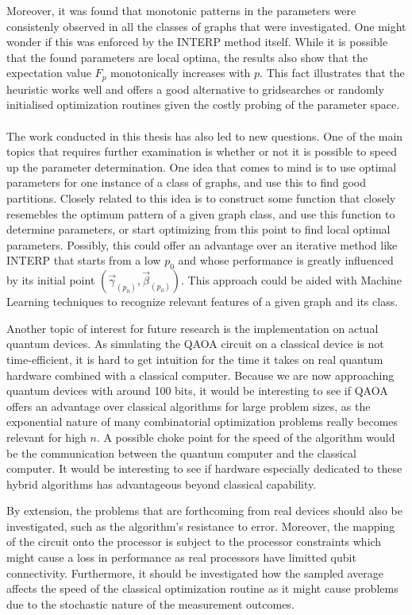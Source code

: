 Moreover, it was found that monotonic patterns in the parameters were consistenly observed in all the classes of graphs that were investigated. One might wonder if this was enforced by the INTERP method itself. While it is possible that the found parameters are local optima, the results also show that the expectation value $F_p$ monotonically increases with $p$. This fact illustrates that the heuristic works well and offers a good alternative to gridsearches or randomly initialised optimization routines given the costly probing of the parameter space.
\\~\\
The work conducted in this thesis has also led to new questions. One of the main topics that requires further examination is whether or not it is possible to speed up the parameter determination. One idea that comes to mind is to use optimal parameters for one instance of a class of graphs, and use this to find good partitions. Closely related to this idea is to construct some function that closely resemebles the optimum pattern of a given graph class, and use this function to determine parameters, or start optimizing from this point to find local optimal parameters. Possibly, this could offer an advantage over an iterative method like INTERP that starts from a low $p_0$ and whose performance is greatly influenced by its initial point $(\vec{\gamma}_{(p_0)}, \vec{\beta}_{(p_0)})$. This approach could be aided with Machine Learning techniques to recognize relevant features of a given graph and its class.

Another topic of interest for future research is the implementation on actual quantum devices. As simulating the QAOA circuit on a classical device is not time-efficient, it is hard to get intuition for the time it takes on real quantum hardware combined with a classical computer. Because we are now approaching quantum devices with around 100 bits, it would be interesting to see if QAOA offers an advantage over classical algorithms for large problem sizes, as the exponential nature of many combinatorial optimization problems really becomes relevant for high $n$. A possible choke point for the speed of the algorithm would be the communication between the quantum computer and the classical computer. It would be interesting to see if hardware especially dedicated to these hybrid algorithms has advantageous beyond classical capability.

By extension, the problems that are forthcoming from real devices should also be investigated, such as the algorithm's resistance to error. Moreover, the mapping of the circuit onto the processor is subject to the processor constraints which might cause a loss in performance as real processors have limitted qubit connectivity. Furthermore, it should be investigated how the sampled average affects the speed of the classical optimization routine as it might cause problems due to the stochastic nature of the measurement outcomes.



